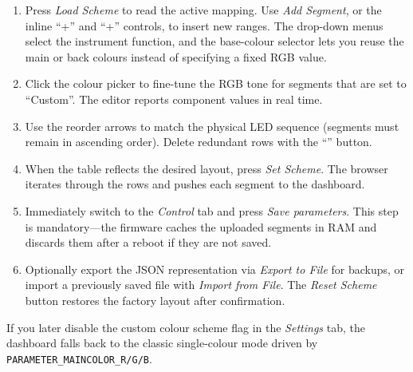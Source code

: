 \begin{enumerate}
    \item Press \emph{Load Scheme} to read the active mapping. Use \emph{Add Segment}, or the inline ``+\textuparrow{}'' and ``+\textdownarrow{}'' controls, to insert new ranges. The drop-down menus select the instrument function, and the base-colour selector lets you reuse the main or back colours instead of specifying a fixed RGB value.
    \item Click the colour picker to fine-tune the RGB tone for segments that are set to ``Custom''. The editor reports component values in real time.
    \item Use the reorder arrows to match the physical LED sequence (segments must remain in ascending order). Delete redundant rows with the ``\texttimes{}'' button.
    \item When the table reflects the desired layout, press \emph{Set Scheme}. The browser iterates through the rows and pushes each segment to the dashboard.
    \item Immediately switch to the \emph{Control} tab and press \emph{Save parameters}. This step is mandatory---the firmware caches the uploaded segments in RAM and discards them after a reboot if they are not saved.
    \item Optionally export the JSON representation via \emph{Export to File} for backups, or import a previously saved file with \emph{Import from File}. The \emph{Reset Scheme} button restores the factory layout after confirmation.
\end{enumerate}

If you later disable the custom colour scheme flag in the \emph{Settings} tab, the dashboard falls back to the classic single-colour mode driven by \verb|PARAMETER_MAINCOLOR_R/G/B|.
